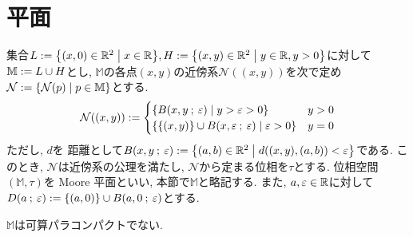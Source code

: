\documentclass[uplatex, dvipdfmx, a4paper, 12pt, class=jsbook, crop=false]{standalone}
\begin{document}
\section{\Moore 平面}
\label{ex:Moore-plane}

\newcommand{\locref}[1]{\ref{LocalLabel-\thepart-\thechapter-\thesection:#1}}
\newcommand{\loclabel}[1]{\label{LocalLabel-\thepart-\thechapter-\thesection:#1}}
\newcommand{\starset}[2]{\mathrm{St}\left(#1 , \: #2\right)}
\newcommand{\sstarset}[3]{\mathrm{St}^{#1}\left(#2 , \: #3 \right)}

集合$ L \defeq \setcomp{(x, 0) \in \R^2}{x \in \R}, H \defeq \setcomp{(x, y) \in \R^2}{y \in \R, y > 0} $に対して$ \mathbb{M} \mathrel{:=} L \cup H $とし, $\mathbb{M} $の各点$ (x, y) $の近傍系$ \mathcal{N}((x, y)) $を次で定め$ \mathcal{N} \defeq \setcomp{\mathcal{N}(p)}{p \in \mathbb{M}} $とする.
$$ \mathcal{N}((x,y)) \defeq \begin{cases}
\setcomp{B(x, y\semicolon \varepsilon)}{y > \varepsilon > 0} & y > 0\\
\setcomp{\{(x, y)\} \cup B(x, \varepsilon\semicolon \varepsilon)}{\varepsilon >0} & y = 0
\end{cases}$$
ただし, $ d $を \Euclid 距離として$ B(x, y\semicolon \varepsilon) \defeq \setcomp{(a, b) \in \R^2}{d((x, y), (a, b)) < \varepsilon}$である. このとき, $ \mathcal{N} $は近傍系の公理を満たし, $ \mathcal{N} $から定まる位相を$ \tau $とする. 位相空間$ (\mathbb{M}, \tau) $を Moore 平面といい, 本節で$ \mathbb{M} $と略記する. また, $ a, \varepsilon \in \mathbb{R} $に対して$ D(a\mathpunct{\: ; \:} \varepsilon) \mathrel{:=} \{(a, 0)\} \cup B(a, 0 \mathpunct{\: ; \:} \varepsilon)$とする.

\begin{property}
	$ \mathbb{M} $は可算パラコンパクトでない.
\end{property}
\end{document}
